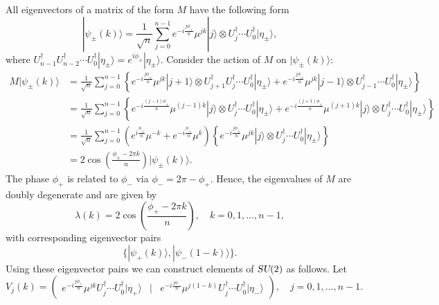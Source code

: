 \documentclass[12pt]{amsart}
\def\su2{\textsl{SU}(2)}
\theoremstyle{definition}
\theoremstyle{remark}
\numberwithin{equation}{section}
\begin{document}
All eigenvectors of a matrix of the form $M$ have the following form
\begin{equation}
	|\psi_{\pm}(k)\rangle = \frac{1}{\sqrt{n}}\sum_{j=0}^{n-1} e^{-i\frac{j\phi_{\pm}}{n}}\mu^{jk}|j\rangle \otimes U_{j}^\dag\cdots U_0^\dag |\eta_{\pm}\rangle,
\end{equation}
where $U_{n-1}^\dag U_{n-2}^\dag \cdots U_0^\dag |\eta_{\pm}\rangle = e^{i\phi_{\pm}}|\eta_{\pm}\rangle$. Consider the action of $M$ on $|\psi_{\pm}(k)\rangle$:
\begin{equation}
	\begin{split}
	M|\psi_{\pm}(k)\rangle &= \frac{1}{\sqrt{n}}\sum_{j=0}^{n-1}\left\{ e^{-i\frac{j\phi_{\pm}}{n}}\mu^{jk}|j+1\rangle \otimes U_{j+1}^\dag U_{j}^\dag \cdots U_0^\dag |\eta_{\pm}\rangle + e^{-i\frac{j\phi_{\pm}}{n}}\mu^{jk}|j-1\rangle \otimes U_{j-1}^\dag \cdots U_0^\dag |\eta_{\pm}\rangle \right\} \\
	&=\frac{1}{\sqrt{n}}\sum_{j=0}^{n-1}\left\{ e^{-i\frac{(j-1)\phi_{\pm}}{n}}\mu^{(j-1)k}|j\rangle \otimes U_{j}^\dag \cdots U_0^\dag |\eta_{\pm}\rangle + e^{-i\frac{(j+1)\phi_{\pm}}{n}}\mu^{(j+1)k}|j\rangle \otimes U_{j}^\dag\cdots U_0^\dag |\eta_{\pm}\rangle \right\} \\
	&=\frac{1}{\sqrt{n}}\sum_{j=0}^{n-1}\left(e^{i\frac{\phi_{\pm}}{n}}\mu^{-k} + e^{-i\frac{\phi_{\pm}}{n}}\mu^{k}\right )\left\{ e^{-i\frac{j\phi_{\pm}}{n}}\mu^{jk}|j\rangle \otimes U_{j}^\dag\cdots U_0^\dag |\eta_{\pm}\rangle \right\} \\
	&= 2\cos\left(\frac{\phi_{\pm} -2\pi k}{n}\right)|\psi_{\pm}(k)\rangle.
	\end{split}
\end{equation}
The phase $\phi_+$ is related to $\phi_-$ via $\phi_- = 2\pi - \phi_+$. Hence, the eigenvalues of $M$ are doubly degenerate and are given by
\begin{equation}
	\lambda(k) = 2\cos\left(\frac{\phi_{+} -2\pi k}{n}\right), \quad k = 0, 1, \ldots, n-1,
\end{equation}
with corresponding eigenvector pairs
\begin{equation}
	\{|\psi_{+}(k)\rangle, |\psi_{-}(1-k)\rangle\}.
\end{equation}
Using these eigenvector pairs we can construct elements of $\su2$ as follows. Let 
\begin{equation}\label{eq:interpespaces}
	V_j(k) = \begin{pmatrix} e^{-i\frac{j\phi_{+}}{n}}\mu^{jk}U_{j}^\dag \cdots U_0^\dag |\eta_{+}\rangle & \Big| & e^{-i\frac{j\phi_{-}}{n}}\mu^{j(1-k)}U_{j}^\dag\cdots U_0^\dag |\eta_{-}\rangle\end{pmatrix}, \quad j = 0, 1, \ldots, n-1.
\end{equation}
\end{document}
